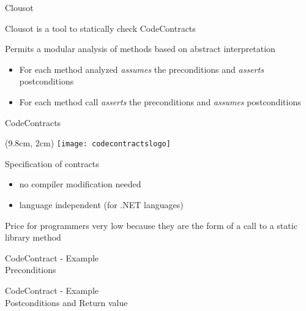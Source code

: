 \begin{frame}{Clousot}

Clousot is a tool to statically check CodeContracts

\vspace*{1cm}

Permits a modular analysis of methods based on abstract interpretation
\begin{itemize}
  \item For each method analyzed \emph{assumes} the preconditions and
  \emph{asserts} postconditions

  \item For each method call \emph{asserts} the preconditions and
  \emph{assumes} postconditions
\end{itemize}

\end{frame}



\begin{frame}{CodeContracts}

\begin{textblock*}{1cm}(9.8cm, 2cm)
    \texttt{[image: codecontractslogo]}
\end{textblock*}

Specification of contracts
\begin{itemize}
  \item no compiler modification needed
  \item language independent (for .NET languages)
\end{itemize}

\vspace*{1cm}

Price for programmers very low because they are the form of a call to a static
library method

\end{frame}


\begin{frame}[fragile]{CodeContract - Example\\Preconditions}
\vspace*{-0.4cm}

\end{frame}



\begin{frame}[fragile]{CodeContract - Example\\Postconditions and Return value}
\vspace*{-0.3cm}

\end{frame}



